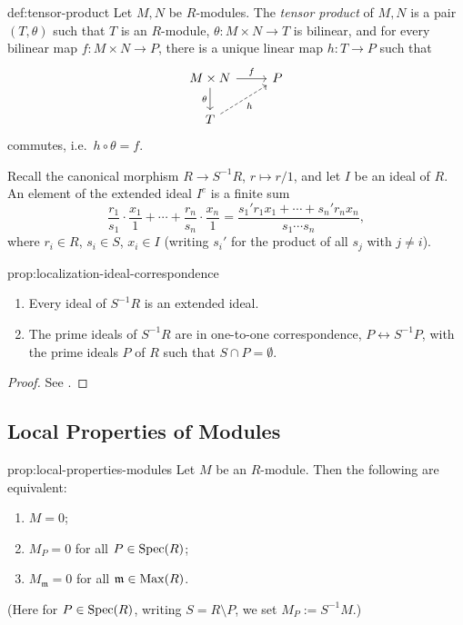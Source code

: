 \begin{definition}{}{def:tensor-product}
Let $M, N$ be $R$-modules. The \emph{tensor product} of $M,N$ is a pair $(T,\theta)$ such that $T$ is an $R$-module, $\theta: M\times N \to T$ is bilinear, and for every bilinear map $f: M\times N \to P$, there is a unique linear map $h: T\to P$ such that
\[
\begin{tikzcd}
M\times N \arrow[r,"f"] \arrow[d,"\theta"'] & P \\
T \arrow[ur,dashed,"h"'] &
\end{tikzcd}
\]
commutes, i.e.\ $h\circ\theta = f$.
\end{definition}

Recall the canonical morphism $R \to S^{-1}R$, $r\mapsto r/1$, and let $I$ be an ideal of $R$. An element of the extended ideal $I^e$ is a finite sum
\[
\frac{r_1}{s_1}\cdot\frac{x_1}{1} + \cdots + \frac{r_n}{s_n}\cdot\frac{x_n}{1} = \frac{s_1' r_1 x_1 + \cdots + s_n' r_n x_n}{s_1\cdots s_n},
\]
where $r_i \in R$, $s_i \in S$, $x_i \in I$ (writing $s_i'$ for the product of all $s_j$ with $j\neq i$).

\begin{proposition}{}{prop:localization-ideal-correspondence}
\begin{enumerate}[label=(\arabic*)]
    \item Every ideal of $S^{-1}R$ is an extended ideal.
    \item The prime ideals of $S^{-1}R$ are in one-to-one correspondence, $P \leftrightarrow S^{-1}P$, with the prime ideals $P$ of $R$ such that $S \cap P = \emptyset$.
\end{enumerate}
\end{proposition}

\begin{proof}
See \cite{AtiyahMacdonald}.
\end{proof}

\subsection*{Local Properties of Modules}

\begin{proposition}{}{prop:local-properties-modules}
Let $M$ be an $R$-module. Then the following are equivalent:
\begin{enumerate}[label=(\arabic*)]
    \item $M = 0$;
    \item $M_P = 0$ for all $P \in \operatorname{Spec}(R)$;
    \item $M_{\mathfrak m} = 0$ for all $\mathfrak m \in \operatorname{Max}(R)$.
\end{enumerate}
(Here for $P \in \operatorname{Spec}(R)$, writing $S = R\setminus P$, we set $M_P := S^{-1}M$.)
\end{proposition}

